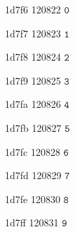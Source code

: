 \documentclass[11pt]{article}
\begin{document}
1d7f6 120822 \ensuremath{\mathtt{0}}

1d7f7 120823 \ensuremath{\mathtt{1}}

1d7f8 120824 \ensuremath{\mathtt{2}}

1d7f9 120825 \ensuremath{\mathtt{3}}

1d7fa 120826 \ensuremath{\mathtt{4}}

1d7fb 120827 \ensuremath{\mathtt{5}}

1d7fc 120828 \ensuremath{\mathtt{6}}

1d7fd 120829 \ensuremath{\mathtt{7}}

1d7fe 120830 \ensuremath{\mathtt{8}}

1d7ff 120831 \ensuremath{\mathtt{9}}
\end{document}

